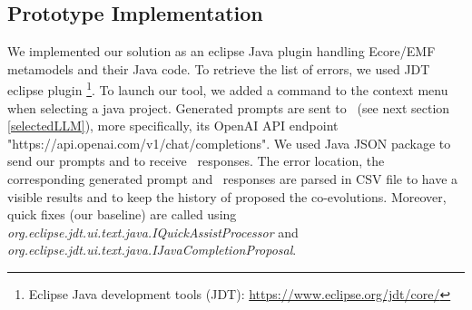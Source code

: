 \subsection{Prototype Implementation}
We implemented our solution as an eclipse Java plugin handling Ecore/EMF metamodels and their Java code. To retrieve the list of errors, we used JDT eclipse plugin \footnote{Eclipse Java development tools (JDT): \url{https://www.eclipse.org/jdt/core/}}. To launch our tool, we added a command to the context menu when selecting a java project. Generated prompts are sent to \LLM~(see next section \ref{selectedLLM}), more specifically, its OpenAI API endpoint "https://api.openai.com/v1/chat/completions". We used Java JSON package to send our prompts and to receive \LLM~responses. The error location, the corresponding generated prompt and \LLM~responses are parsed in CSV file to have a visible results and to keep the history of proposed the co-evolutions.
Moreover, quick fixes (our baseline) are called using 
\textit{org.eclipse.jdt.ui.text.java.IQuickAssistProcessor} and \textit{org.eclipse.jdt.ui.text.java.IJavaCompletionProposal}.

